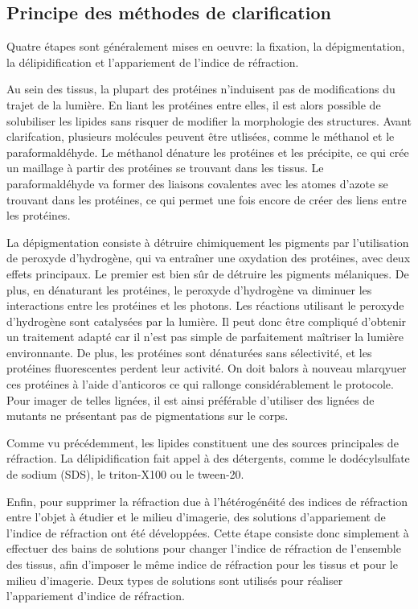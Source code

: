 \documentclass[\main/main.tex]{subfiles}
\begin{document}
\subsection{Principe des méthodes de clarification}

Quatre étapes sont généralement mises en oeuvre\cite{tainaka_2016,ueda_2020}: la fixation, la dépigmentation, la délipidification et l'appariement de l'indice de réfraction.
%

%
Au sein des tissus, la plupart des protéines n'induisent pas de modifications du trajet de la lumière. En liant les protéines entre elles, il est alors possible de solubiliser les lipides sans risquer de modifier la morphologie des structures. Avant clarifcation, plusieurs molécules peuvent être utlisées, comme le méthanol et le paraformaldéhyde. Le méthanol dénature les protéines et les précipite, ce qui crée un maillage à partir des protéines se trouvant dans les tissus. Le paraformaldéhyde va former des liaisons covalentes avec les atomes d'azote se trouvant dans les protéines, ce qui permet une fois encore de créer des liens entre les protéines.

%
La dépigmentation consiste à détruire chimiquement les pigments par l'utilisation de peroxyde d'hydrogène, qui va entraîner une oxydation des protéines, avec deux effets principaux. Le premier est bien sûr de détruire les pigments mélaniques. De plus, en dénaturant les protéines, le peroxyde d'hydrogène va diminuer les interactions entre les protéines et les photons.
%
Les réactions utilisant le peroxyde d'hydrogène sont catalysées par la lumière. Il peut donc être compliqué d'obtenir un traitement adapté car il n'est pas simple de parfaitement maîtriser la lumière environnante. De plus, les protéines sont dénaturées sans sélectivité, et les protéines fluorescentes perdent leur activité. On doit balors à nouveau mlarqyuer ces protéines à l'aide d'anticoros ce qui rallonge considérablement le protocole.
%
Pour imager de telles lignées, il est ainsi préférable d'utiliser des lignées de  mutants ne présentant pas de pigmentations sur le corps\cite{white_2008,antinucci_2016}.

Comme vu précédemment, les lipides constituent une des sources principales de réfraction. %
%
La délipidification fait appel à des détergents, comme le dodécylsulfate de sodium (SDS), le triton-X100 ou le tween-20.

%
Enfin, pour supprimer la réfraction due à l'hétérogénéité des indices de réfraction entre l'objet à étudier et le milieu d'imagerie, des solutions d'appariement de l'indice de réfraction ont été développées.
%
Cette étape consiste donc simplement à effectuer des bains de solutions pour changer l'indice de réfraction de l'ensemble des tissus, afin d'imposer le même indice de réfraction pour les tissus et pour le milieu d'imagerie.
%
Deux types de solutions sont utilisés pour réaliser l'appariement d'indice de réfraction.
\end{document}
